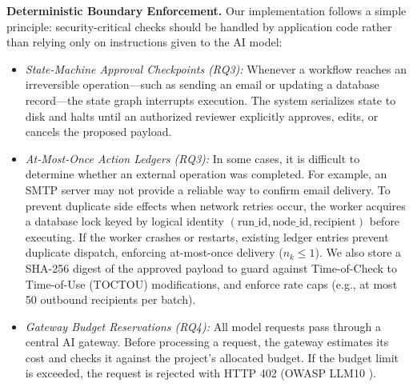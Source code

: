 \documentclass[sigconf]{acmart}
\begin{document}
\textbf{Deterministic Boundary Enforcement.} Our implementation follows a simple principle: security-critical checks should be handled by application code rather than relying only on instructions given to the AI model:
\begin{itemize}
  \item \emph{State-Machine Approval Checkpoints (RQ3):} Whenever a workflow reaches an irreversible operation—such as sending an email or updating a database record—the state graph interrupts execution. The system serializes state to disk and halts until an authorized reviewer explicitly approves, edits, or cancels the proposed payload.
  \item \emph{At-Most-Once Action Ledgers (RQ3):} In some cases, it is difficult to determine whether an external operation was completed. For example, an SMTP server may not provide a reliable way to confirm email delivery. To prevent duplicate side effects when network retries occur, the worker acquires a database lock keyed by logical identity $(\text{run\_id}, \text{node\_id}, \text{recipient})$ before executing. If the worker crashes or restarts, existing ledger entries prevent duplicate dispatch, enforcing at-most-once delivery ($n_k \le 1$). We also store a SHA-256 digest of the approved payload to guard against Time-of-Check to Time-of-Use (TOCTOU) modifications, and enforce rate caps (e.g., at most 50 outbound recipients per batch).
  \item \emph{Gateway Budget Reservations (RQ4):} All model requests pass through a central AI gateway. Before processing a request, the gateway estimates its cost and checks it against the project's allocated budget. If the budget limit is exceeded, the request is rejected with HTTP 402 (OWASP LLM10 \cite{owasp2025llm}).
\end{itemize}
\end{document}
